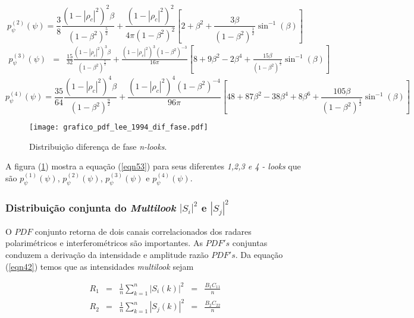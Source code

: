 \begin{equation}\label{eqn56}
	p_{\psi}^{(2)}(\psi)=\frac{3}{8}\frac{(1-|\rho_c|^2)^2\beta}{(1-\beta^2)^{\frac{5}{2}}}+\frac{(1-|\rho_c|^2)^2}{4\pi(1-\beta^2)^{2}}\left[2+\beta^2+\frac{3\beta}{(1-\beta^2)^{\frac{1}{2}}}\sin^{-1}(\beta)\right]
\end{equation}
\begin{equation}\label{eqn57}
\begin{array}{ccc}
	p_{\psi}^{(3)}(\psi)&=&\frac{15}{32}\frac{(1-|\rho_c|^2)^3\beta}{(1-\beta^2)^{\frac{7}{2}}}+\frac{(1-|\rho_c|^2)^3(1-\beta^2)^{-3}}{16\pi}\left[8+9\beta^2-2\beta^4+\frac{15\beta}{(1-\beta^2)^{\frac{1}{2}}}\sin^{-1}(\beta)\right]
\end{array}
\end{equation}
\begin{equation}\label{eqn58}
	p_{\psi}^{(4)}(\psi)=\frac{35}{64}\frac{(1-|\rho_c|^2)^4\beta}{(1-\beta^2)^{\frac{9}{2}}}+\frac{(1-|\rho_c|^2)^4(1-\beta^2)^{-4}}{96\pi}\left[48+87\beta^2-38\beta^4+8\beta^6+\frac{105\beta}{(1-\beta^2)^{\frac{1}{2}}}\sin^{-1}(\beta)\right]
\end{equation}

\begin{figure}[hbt]
\centering
\texttt{[image: grafico\_pdf\_lee\_1994\_dif\_fase.pdf]}
	\caption{Distribuição diferença de fase {\it n-looks}.}
\label{fig1}
\end{figure}

A  figura (\ref{fig1}) mostra a equação (\ref{eqn53}) para seus diferentes {\it 1,2,3 e 4 - looks} que são $p_{\psi}^{(1)}(\psi)$, $p_{\psi}^{(2)}(\psi)$, $p_{\psi}^{(3)}(\psi)$ e $p_{\psi}^{(4)}(\psi)$.

\subsubsection{Distribuição conjunta do {\it Multilook} $|S_i|^2$ e $|S_j|^2$ }

O $PDF$ conjunto retorna de dois canais correlacionados dos radares polarimétricos e interferométricos são importantes. As $PDF's$ conjuntas conduzem a derivação da intensidade e amplitude razão $PDF's$. Da equação (\ref{eqn42}) temos que as intensidades {\it multilook} sejam 

\begin{equation}\label{eqn59}
\begin{array}{ccccc}
	R_1&=&\frac{1}{n}\sum_{k=1}^{n}|S_i(k)|^2&=&\frac{B_1C_{11}}{n}\\
	R_2&=&\frac{1}{n}\sum_{k=1}^{n}|S_j(k)|^2&=&\frac{B_2C_{22}}{n}\\
\end{array}
\end{equation}

